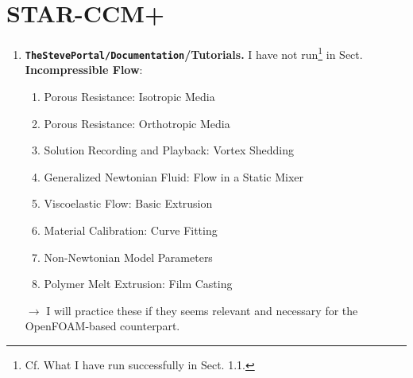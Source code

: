 \documentclass[onsided]{book}
\numberwithin{equation}{section}
\begin{document}
\section{STAR-CCM+}
\begin{enumerate}
    \item \textbf{\texttt{TheStevePortal/Documentation}/Tutorials.}  I have not run\footnote{Cf. What I have run successfully in Sect. 1.1.} in Sect. \textbf{Incompressible Flow}:
    \begin{enumerate}
        \item Porous Resistance: Isotropic Media
        \item Porous Resistance: Orthotropic Media
        \item Solution Recording and Playback: Vortex Shedding
        \item Generalized Newtonian Fluid: Flow in a Static Mixer
        \item Viscoelastic Flow: Basic Extrusion
        \item Material Calibration: Curve Fitting \item Non-Newtonian Model Parameters
        \item Polymer Melt Extrusion: Film Casting
    \end{enumerate}
    $\to$ I will practice these if they seems relevant and necessary for the OpenFOAM-based counterpart.
\end{enumerate}
\end{document}

